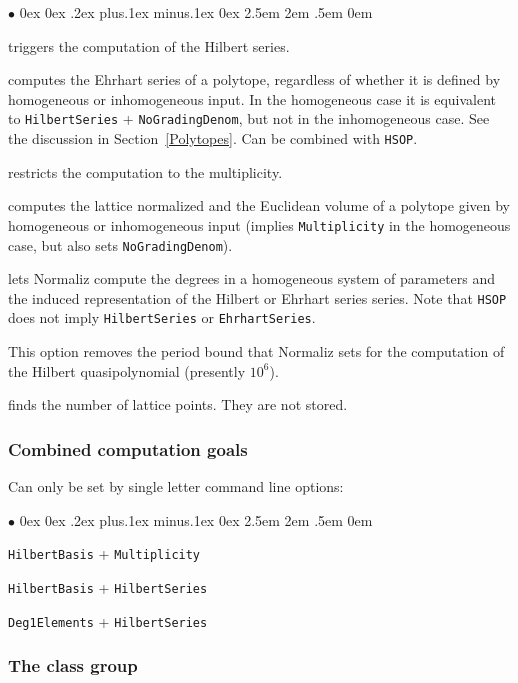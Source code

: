 \documentclass[12pt,a4paper]{scrartcl}
\newcommand{\stdli}{ \topsep0ex \partopsep0ex %
\parsep.2ex plus.1ex minus.1ex \itemsep0ex%
\leftmargin2.5em \labelwidth2em \labelsep.5em \rightmargin0em}%
\renewenvironment{itemize}{\begin{list}{{$\bullet$}}{\stdli}}{\end{list}}
\theoremstyle{definition}
\def\itemtt[#1]{\item[\textbf{\ttt{#1}}]}
\def\ttt{\texttt}
\begin{document}
\begin{itemize}
	\itemtt [HilbertSeries,-q] triggers the computation of the Hilbert series.
	
	\itemtt[EhrhartSeries] computes the Ehrhart series of a polytope, regardless of whether it is defined by homogeneous or inhomogeneous input. In the homogeneous case it is equivalent to \verb|HilbertSeries| + \verb|NoGradingDenom|, but not in the inhomogeneous case. See the discussion in Section~\ref{Polytopes}. Can be combined with \verb|HSOP|.
	
	\itemtt[Multiplicity, -v] restricts the computation to the multiplicity.
	
	\itemtt[Volume, -V] computes the lattice normalized and the Euclidean volume of a polytope given by homogeneous or inhomogeneous input (implies \verb|Multiplicity| in the homogeneous case, but also sets \verb|NoGradingDenom|).
	
	\itemtt[HSOP] lets Normaliz compute the degrees in a homogeneous system of parameters and the induced representation of the Hilbert or Ehrhart series series. Note that \ttt{HSOP} does not imply \ttt{HilbertSeries} or \ttt{EhrhartSeries}.
	
	\itemtt[NoPeriodBound] This option removes the period bound that Normaliz sets for the computation of the Hilbert quasipolynomial (presently $10^6$).
	
	\itemtt[NumberLatticePoints] finds the number of lattice points. They are not stored.
\end{itemize}

\subsubsection{Combined computation goals}

Can only be set by single letter command line options:

\begin{itemize}
	\itemtt[-n] \verb|HilbertBasis| + \verb|Multiplicity|
	
	\itemtt[-h] \verb|HilbertBasis| + \verb|HilbertSeries|
	
	\itemtt[-p] \verb|Deg1Elements| + \verb|HilbertSeries|
	
\end{itemize}

\subsubsection{The class group}
\end{document}
